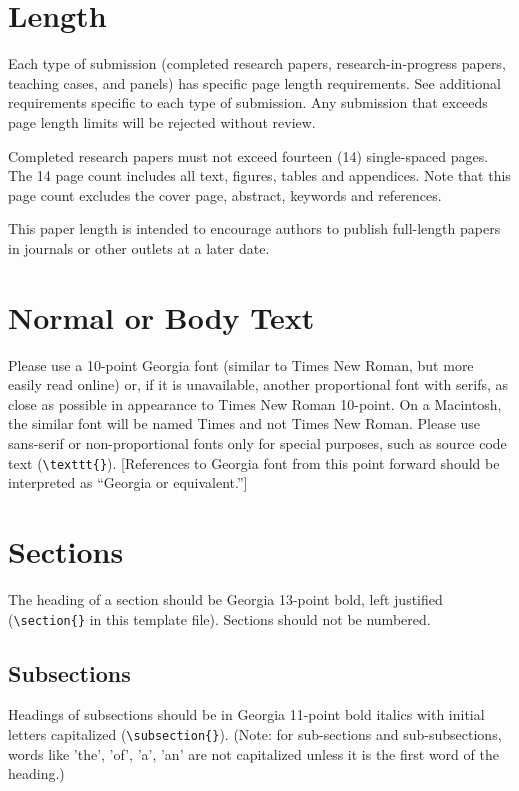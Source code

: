 \documentclass{icis}
\begin{document}
\section{Length}
Each type of submission (completed research papers, research-in-progress papers,
teaching cases, and panels) has specific page length requirements. See
additional requirements specific to each type of submission. Any submission that
exceeds page length limits will be rejected without review.

Completed research papers must not exceed fourteen (14) single-spaced pages. The
14 page count includes all text, figures, tables and appendices. Note that this
page count excludes the cover page, abstract, keywords and references. 

This paper length is intended to encourage authors to publish full-length papers
in journals or other outlets at a later date.

\section{Normal or Body Text}
Please use a 10-point Georgia font (similar to Times New Roman, but more easily
read online) or, if it is unavailable, another proportional font with serifs, as
close as possible in appearance to Times New Roman 10-point. On a Macintosh, the
similar font will be named Times and not Times New Roman. Please use sans-serif
or non-proportional fonts only for special purposes, such as source code text
(\texttt{\textbackslash texttt\{\}}). [References to Georgia font from this
point forward should be interpreted as ``Georgia or equivalent.'']

\section{Sections}
The heading of a section should be Georgia 13-point bold, left justified
(\texttt{\textbackslash section\{\}} in this template file).  Sections should not be numbered.

\subsection{Subsections}
Headings of subsections should be in Georgia 11-point bold italics with initial
letters capitalized (\texttt{\textbackslash subsection\{\}}). (Note: for
sub-sections and sub-subsections, words like 'the', 'of', 'a', 'an' are not
capitalized unless it is the first word of the heading.)
\end{document}
